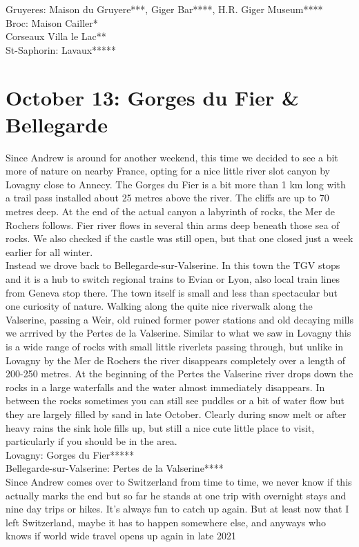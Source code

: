 Gruyeres: Maison du Gruyere***, Giger Bar****, H.R. Giger Museum****\\
Broc: Maison Cailler*\\
Corseaux Villa le Lac**\\
St-Saphorin: Lavaux*****

\section{October 13: Gorges du Fier \& Bellegarde}
\label{Bellegarde2019}

Since Andrew is around for another weekend, this time we decided to see a bit more of nature on nearby France, opting for a nice little river slot canyon by Lovagny close to Annecy. The Gorges du Fier is a bit more than 1 km long with a trail pass installed about 25 metres above the river. The cliffs are up to 70 metres deep. At the end of the actual canyon a labyrinth of rocks, the Mer de Rochers follows. Fier river flows in several thin arms deep beneath those sea of rocks. We also checked if the castle was still open, but that one closed just a week earlier for all winter.\\
Instead we drove back to Bellegarde-sur-Valserine. In this town the TGV stops and it is a hub to switch regional trains to Evian or Lyon, also local train lines from Geneva stop there. The town itself is small and less than spectacular but one curiosity of nature. Walking along the quite nice riverwalk along the Valserine, passing a Weir, old ruined former power stations and old decaying mills we arrrived by the Pertes de la Valserine. Similar to what we saw in Lovagny this is a wide range of rocks with small little riverlets passing through, but unlike in Lovagny by the Mer de Rochers the river disappears completely over a length of 200-250 metres. At the beginning of the Pertes the Valserine river drops down the rocks in a large waterfalls and the water almost immediately disappears. In between the rocks sometimes you can still see puddles or a bit of water flow but they are largely filled by sand in late October. Clearly during snow melt or after heavy rains the sink hole fills up, but still a nice cute little place to visit, particularly if you should be in the area.\\

Lovagny: Gorges du Fier*****\\
Bellegarde-sur-Valserine: Pertes de la Valserine****\\

Since Andrew comes over to Switzerland from time to time, we never know if this actually marks the end but so far he stands at one trip with overnight stays and nine day trips or hikes. It's always fun to catch up again. But at least now that I left Switzerland, maybe it has to happen somewhere else, and anyways who knows if world wide travel opens up again in late 2021\\

